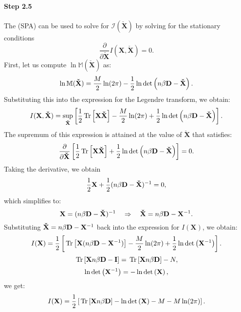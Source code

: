 \paragraph{Step 2.5}
The \SaddlePointApproximation (SPA) can be used to solve for $\mathcal{I}(\mathbf{\check{X}})$ 
by solving for the stationary conditions
\begin{equation}
  \frac{\partial}{\partial \mathbf{\check{X}}} I(\mathbf{X},\mathbf{\check{X}}) = 0  .
\end{equation}
%
First, let us compute $ \ln \mathbb{M}(\mathbf{\check{X}}) $ as:
%
\begin{equation}
\ln \mathbb{M}(\mathbf{\check{X}}) = \frac{M}{2} \ln(2\pi) - \frac{1}{2} \ln \mbox{}{\text{det}}\left(n\beta\mathbf{D} - \mathbf{\check{X}}\right).
\end{equation}
%
Substituting this into the expression for the Legendre transform, we obtain:
%
\begin{equation}
I(\mathbf{X},\mathbf{\check{X}}) 
   = \sup_{\mathbf{\check{X}}} \left[\frac{1}{2} \mbox{}\operatorname{Tr}\left[\mathbf{X} \mathbf{\check{X}}\right] - \frac{M}{2} \ln(2\pi) + \frac{1}{2} \ln \mbox{}{\text{det}}\left(n\beta\mathbf{D} - \mathbf{\check{X}}\right) \right].
\end{equation}
%
The supremum of this expression is attained at the value of $\mathbf{\check{X}}$ that satisfies:
%
\begin{equation}
\frac{\partial}{\partial \mathbf{\check{X}}} \left[\frac{1}{2} \mbox{}\operatorname{Tr}\left[\mathbf{X} \mathbf{\check{X}}\right] + \frac{1}{2} \ln \mbox{}{\text{det}}\left(n\beta\mathbf{D} - \mathbf{\check{X}}\right) \right] = 0.
\end{equation}
%
Taking the derivative, we obtain
%
\begin{equation}
\frac{1}{2} \mathbf{X} + \frac{1}{2} (n\beta\mathbf{D} - \mathbf{\check{X}})^{-1} = 0,
\end{equation}
%
which simplifies to:
%
\begin{equation}
\mathbf{X} = (n\beta\mathbf{D} - \mathbf{\check{X}})^{-1} \quad \Rightarrow \quad \mathbf{\check{X}} = n\beta\mathbf{D} - \mathbf{X}^{-1}.
\end{equation}
%
Substituting $ \mathbf{\check{X}} = n\beta\mathbf{D} - \mathbf{X}^{-1} $ back into the expression for $ I(\mathbf{X})$, we obtain:
%
\begin{equation}
I(\mathbf{X}) = \frac{1}{2} \left[\mbox{}\operatorname{Tr}\left[\mathbf{X} (n\beta\mathbf{D} - \mathbf{X}^{-1})\right] - \frac{M}{2} \ln(2\pi) + \frac{1}{2} \ln \mbox{}{\text{det}}\left(\mathbf{X}^{-1}\right)\right].
\end{equation}
%
%
\begin{equation}
\mbox{}\operatorname{Tr}\left[\mathbf{X}n\beta\mathbf{D} - \mathbf{I}\right] = \mbox{}\operatorname{Tr}\left[\mathbf{X}n\beta\mathbf{D}\right] - N,
\end{equation}
\begin{equation}
\ln \mbox{}{\text{det}}\left(\mathbf{X}^{-1}\right) = -\ln \mbox{}{\text{det}}\left(\mathbf{X}\right),
\end{equation}
we get:
%
\begin{equation}
I(\mathbf{X}) = \frac{1}{2} \left[\mbox{}\operatorname{Tr}\left[\mathbf{X}n\beta\mathbf{D}\right] - \ln \mbox{}{\text{det}}\left(\mathbf{X}\right) - M - M\ln(2\pi)\right].
\end{equation}

